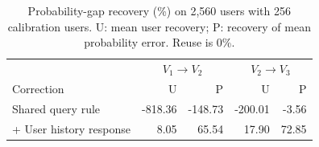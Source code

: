 \begin{table}[tb]
 \caption{Probability-gap recovery (\%) on 2,560 users with 256 calibration users. U: mean user recovery; P: recovery of mean probability error. Reuse is 0\%.}
 \label{tab:insight2-response}
 \centering\small
 \setlength{\tabcolsep}{2pt}
 \begin{tabular*}{\columnwidth}{@{\extracolsep{\fill}}lrrrr@{}}
 \toprule
 & \multicolumn{2}{c}{$V_1\!\to\!V_2$} & \multicolumn{2}{c}{$V_2\!\to\!V_3$}\\
 Correction & U & P & U & P\\\midrule
 Shared query rule & -818.36 & -148.73 & -200.01 & -3.56\\
 + User history response & 8.05 & 65.54 & 17.90 & 72.85\\
 \bottomrule
 \end{tabular*}
\end{table}
